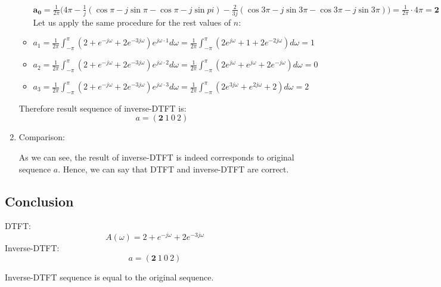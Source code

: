 \documentclass{article}
\begin{document}
\begin{enumerate}
\begin{itemize}
        $\pmb{a_0}=\frac{1}{2\pi}\big(4\pi-\frac{1}{j}(\cos{\pi}-j\sin{\pi}-\cos{\pi}-j\sin{pi})-\frac{2}{3j}(\cos{3\pi}-j\sin{3\pi}-\cos{3\pi}-j\sin{3\pi})\big)=\frac{1}{2\pi}\cdot4\pi=\pmb{2}$\\
        
        Let us apply the same procedure for the rest values of $n$:
        
        \item $a_1=\frac{1}{2\pi}\int^{\pi}_{-\pi}(2+e^{-j\omega}+2e^{-3j\omega})e^{j\omega\cdot1}d\omega=
        \frac{1}{2\pi}\int^{\pi}_{-\pi}(2e^{j\omega}+1+2e^{-2j\omega})d\omega=1$
        
        \item $a_2=\frac{1}{2\pi}\int^{\pi}_{-\pi}(2+e^{-j\omega}+2e^{-3j\omega})e^{j\omega\cdot2}d\omega=
        \frac{1}{2\pi}\int^{\pi}_{-\pi}(2e^{j\omega}+e^{j\omega}+2e^{-j\omega})d\omega=0$
        
        \item $a_3=\frac{1}{2\pi}\int^{\pi}_{-\pi}(2+e^{-j\omega}+2e^{-3j\omega})e^{j\omega\cdot3}d\omega=
        \frac{1}{2\pi}\int^{\pi}_{-\pi}(2e^{3j\omega}+e^{2j\omega}+2)d\omega=2$
    \end{itemize}
    Therefore result sequence of inverse-DTFT is:
    $$a=(\pmb{2}\ 1\ 0\ 2)$$
    
    \item Comparison:
    
    As we can see, the result of inverse-DTFT is indeed corresponds to original sequence $a$. Hence, we can say that DTFT and inverse-DTFT are correct.
\end{enumerate}

\subsection{Conclusion}

DTFT:
$$A(\omega)=2+e^{-j\omega}+2e^{-3j\omega}$$
Inverse-DTFT:
$$a=(\pmb{2}\ 1\ 0\ 2)$$

Inverse-DTFT sequence is equal to the original sequence.
\end{document}
